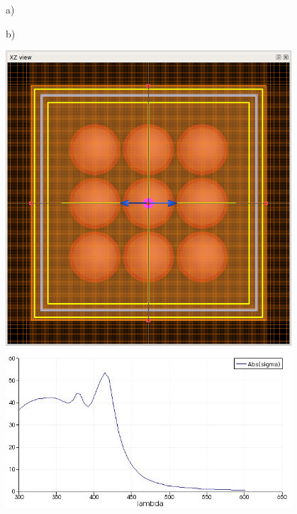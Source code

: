 \documentclass[a4paper]{article}
\begin{document}
\begin{figure}
  \begin{minipage}[h]{0.49\textwidth}    \begin{flushleft}     a)    \end{flushleft}
  \end{minipage}
  \begin{minipage}[h]{0.49\textwidth}    \begin{flushleft}     b)    \end{flushleft}
  \end{minipage}
  \begin{minipage}[h]{0.49\textwidth} 
   \includegraphics[width=0.95\textwidth]{fdtd-3x3}
  \end{minipage}
  \begin{minipage}[h]{0.49\textwidth} 
   \includegraphics[width=0.95\textwidth]{fdtd-spectra-3x3}

\end{minipage}
\end{figure}
\end{document}
